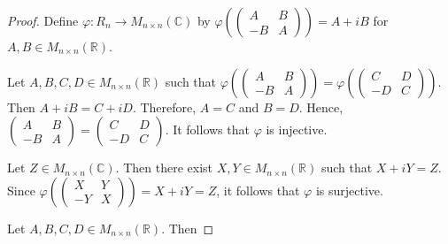 \documentclass[12pt]{article}
\begin{document}
\begin{proof}
Define $\varphi \colon R_n \to M_{n \times n}(\mathbb{C})$ by $\displaystyle \varphi \left( \left( \begin{array}{cc}
A & B \\
-B & A \end{array}
\right) \right) = A+iB$ for $A,B \in M_{n \times n}(\mathbb{R})$.

Let $A,B,C,D \in M_{n \times n}(\mathbb{R})$ such that $\displaystyle \varphi \left( \left( \begin{array}{cc}
A & B \\
-B & A \end{array}
\right) \right) =\varphi \left( \left( \begin{array}{cc}
C & D \\
-D & C \end{array}
\right) \right)$.  Then $A+iB=C+iD$.  Therefore, $A=C$ and $B=D$.  Hence, $\displaystyle \left( \begin{array}{cc}
A & B \\
-B & A \end{array}
\right) = \left( \begin{array}{cc}
C & D \\
-D & C \end{array}
\right)$.  It follows that $\varphi$ is injective.

Let $Z \in M_{n \times n}(\mathbb{C})$.  Then there exist $X,Y \in M_{n \times n}(\mathbb{R})$ such that $X+iY=Z$.  Since $\varphi \left( \left( \begin{array}{cc}
X & Y \\
-Y & X \end{array}
\right) \right)=X+iY=Z$, it follows that $\varphi$ is surjective.

Let $A,B,C,D \in M_{n \times n}(\mathbb{R})$.  Then


\end{proof}
\end{document}
